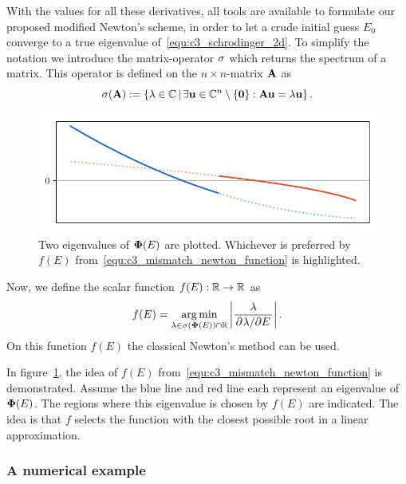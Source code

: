 With the values for all these derivatives, all tools are available to formulate our proposed modified Newton's scheme, in order to let a crude initial guess $E_0$ converge to a true eigenvalue of~\eqref{equ:c3_schrodinger_2d}. To simplify the notation we introduce the matrix-operator $\operatorname{\sigma}$ which returns the spectrum of a matrix. This operator is defined on the $n \times n$-matrix $\vb{A}$ as
$$
  \operatorname{\sigma}(\vb{A}) := \left\{\lambda \in \mathbb{C} \, \middle| \, \exists \vb{u} \in \mathbb{C}^n \setminus \{\vb{0}\} : \vb{A} \vb{u} = \lambda \vb{u} \right\}\text{.}
$$

\begin{figure}
  \begin{center}
    \includegraphics[width=\textwidth]{img/chapter3/select_lambda_newton.pdf}
  \end{center}
  \caption{Two eigenvalues of $\vb{\Phi}(E)$ are plotted. Whichever is preferred by $f(E)$ from~\eqref{equ:c3_mismatch_newton_function} is highlighted.}\label{fig:c3_select_lambda_newton}
\end{figure}

Now, we define the scalar function $f(E) : \mathbb{R} \to \mathbb{R}$ as
\begin{equation}\label{equ:c3_mismatch_newton_function}
  f(E) = \operatorname*{arg\,min}_{\lambda \in \operatorname{\sigma}(\vb{\Phi}(E)) \cap \mathbb{R}} \left|\frac{\lambda}{\pdv*[]{\lambda}{E}}\right|\text{.}
\end{equation}
On this function $f(E)$ the classical Newton's method can be used.

In figure~\ref{fig:c3_select_lambda_newton}, the idea of $f(E)$ from~\eqref{equ:c3_mismatch_newton_function} is demonstrated. Assume the blue line and red line each represent an eigenvalue of $\vb{\Phi}(E)$. The regions where this eigenvalue is chosen by $f(E)$ are indicated. The idea is that $f$ selects the function with the closest possible root in a linear approximation.

\subsubsection{A numerical example}

